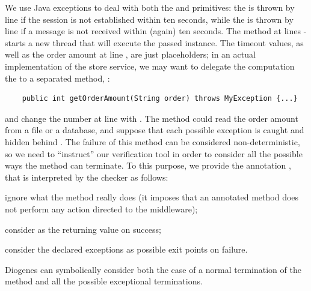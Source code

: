 We use Java exceptions to deal with both the  
and  primitives:
the  is thrown by line  if the session 
is not established within ten seconds, while the 
is thrown by line  if a message is not received within (again) ten seconds.
The  method at lines - starts a new 
thread that will execute the passed  instance.
%
The timeout values, as well as the order amount at line , are just placeholders;
in an actual implementation of the store service, we may want to delegate the computation the  to a separated method, \eg:
\begin{mdframed}
  \begin{verbatim}
    public int getOrderAmount(String order) throws MyException {...}
  \end{verbatim}
\end{mdframed}
and change the number  at line  with .
The method could read the order amount from a file or a database,
and suppose that each possible exception
is caught and hidden behind . 
The failure of this method can be considered non-deterministic,
so we need to ``instruct'' our verification tool
in order to consider all the possible ways the method can terminate.
% 
To this purpose, we provide the annotation , that
is interpreted by the checker as follows:
\begin{inlinelist}[noitemsep,topsep=0pt]
\item ignore what the method really does (it imposes that an annotated 
    method does not perform any action directed to the middleware);
\item consider  as the returning value on success;
\item consider the declared exceptions as possible exit points on failure.
\end{inlinelist}
%
Diogenes can symbolically consider both the case of a normal 
termination of the method
and all the possible exceptional terminations.

